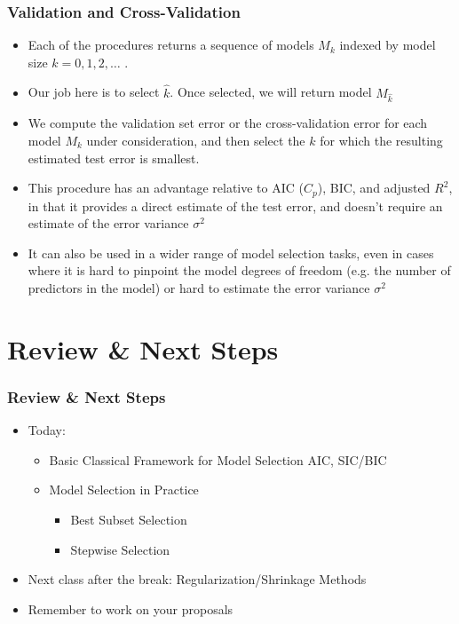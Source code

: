 \documentclass[
  shownotes,
  xcolor={svgnames},
  hyperref={colorlinks,citecolor=DarkBlue,linkcolor=DarkRed,urlcolor=DarkBlue}
  , aspectratio=169]{beamer}
\begin{document}
\begin{frame}[fragile]
\frametitle{Validation and Cross-Validation}

\begin{itemize}
\item Each of the procedures returns a sequence of models $M_k$ indexed by model size $k = 0,1,2,\dots$ .
\item Our job here is to select $\hat k$. Once selected, we will return model $M_{\hat{k}}$
\item We compute the validation set error or the cross-validation error for each model $M_k$ under consideration, and then select the $k$ for which the resulting estimated test error is smallest.
\item This procedure has an advantage relative to AIC ($C_p$), BIC, and adjusted $R^2$, in that it provides a direct estimate of the test error, and doesn't require an estimate of the error variance $\sigma^2$
\item It can also be used in a wider range of model selection tasks, even in cases where it is hard to pinpoint the model degrees of freedom (e.g. the number of predictors in the model) or hard to estimate the error variance $\sigma^2$ 
\end{itemize}
\end{frame}


\section{Review \& Next Steps}
\begin{frame}
\frametitle{Review \& Next Steps}
  
\begin{itemize} 
    \item Today:
    \medskip
    \begin{itemize} 
      \item Basic Classical Framework for Model Selection AIC, SIC/BIC
      \medskip
      \item Model Selection in Practice  
        \begin{itemize}  
            \item Best Subset Selection
            \medskip
            \item Stepwise Selection
        \end{itemize}
    \end{itemize}
  	\bigskip  
	\item  Next class after the break:  Regularization/Shrinkage Methods
  \bigskip  
  \item  Remember to work on your proposals

\end{itemize}
\end{frame}
\end{document}
